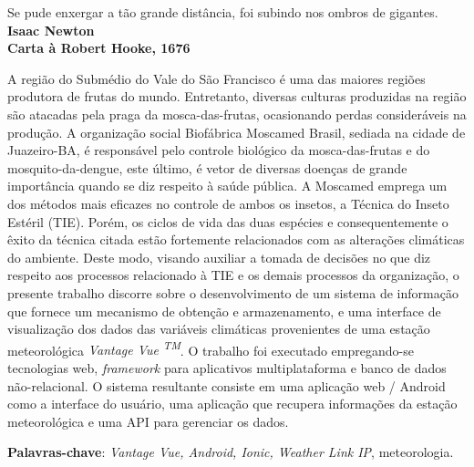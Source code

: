 \begin{epigrafe}
    \vspace*{\fill}
	\begin{flushright}
		Se pude enxergar a tão grande distância, foi subindo nos ombros de gigantes.\\
		 \vspace{\baselineskip}
		\textbf{Isaac Newton}\\
		\textbf{Carta à Robert Hooke, 1676}
	\end{flushright}
\end{epigrafe}


\setlength{\absparsep}{18pt} %
\begin{resumo}
A região do Submédio do Vale do São Francisco é uma das maiores regiões produtora de frutas do mundo. Entretanto, diversas culturas produzidas na região são atacadas pela praga da mosca-das-frutas, ocasionando perdas consideráveis na produção. A organização social Biofábrica Moscamed Brasil, sediada na cidade de Juazeiro-BA, é responsável pelo controle biológico da mosca-das-frutas e do mosquito-da-dengue, este último, é vetor de diversas doenças de grande importância quando se diz respeito à saúde pública. A Moscamed emprega um dos métodos mais eficazes no controle de ambos os insetos, a Técnica do Inseto Estéril (TIE). Porém, os ciclos de vida das duas espécies e consequentemente o êxito da técnica citada estão fortemente relacionados com as alterações climáticas do ambiente. Deste modo, visando auxiliar a tomada de decisões no que diz respeito aos processos relacionado à TIE e os demais processos da organização, o presente trabalho discorre sobre o desenvolvimento de um sistema de informação que fornece um mecanismo de obtenção e armazenamento, e uma interface de visualização dos dados das variáveis climáticas provenientes de uma estação meteorológica \textit{Vantage Vue \textsuperscript{TM}}. O trabalho foi executado empregando-se tecnologias web, \textit{framework} para aplicativos multiplataforma e banco de dados não-relacional. O sistema resultante consiste em uma aplicação web / Android como a interface do usuário, uma aplicação que recupera informações da estação meteorológica e uma API para gerenciar os dados.

 \textbf{Palavras-chave}: \textit{Vantage Vue, Android, Ionic, Weather Link IP}, meteorologia.

\end{resumo}


